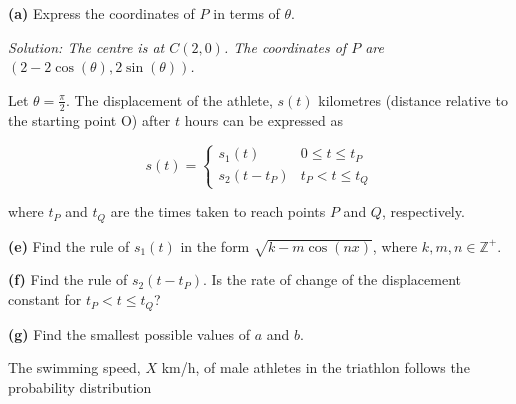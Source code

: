 \documentclass[10pt,a4paper]{article}
\begin{document}
\begin{center}
\end{center}

\textbf{(a)} Express the coordinates of $P$ in terms of $\theta$.

\textit{Solution: The centre is at $C(2,0)$. The coordinates of $P$ are $(2 - 2\cos(\theta), 2\sin(\theta))$.}

\vspace{9\baselineskip}

Let $\theta = \frac{\pi}{2}$. The displacement of the athlete, $s(t)$ kilometres (distance relative to the starting point O) after $t$ hours can be expressed as

\[
s(t) = \begin{cases}
s_1(t) & 0 \leq t \leq t_P\\
s_2(t - t_P) & t_P < t \leq t_Q
\end{cases}
\]

where $t_P$ and $t_Q$ are the times taken to reach points $P$ and $Q$, respectively.

\textbf{(e)} Find the rule of $s_1(t)$ in the form $\sqrt{k - m\cos(nx)}$, where $k, m, n \in \mathbb{Z}^+$.

\vspace{9\baselineskip}

\textbf{(f)} Find the rule of $s_2(t - t_P)$. Is the rate of change of the displacement constant for $t_P < t \leq t_Q$?

\vspace{9\baselineskip}

\textbf{(g)} Find the smallest possible values of $a$ and $b$.

The swimming speed, $X$ km/h, of male athletes in the triathlon follows the probability distribution
\end{document}
